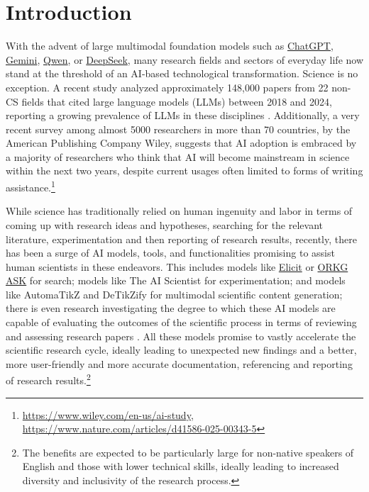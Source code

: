 \section{Introduction}\label{sec:introduction}
With the advent of large multimodal foundation models such as \href{https://chatgpt.com/}{ChatGPT}, \href{https://deepmind.google/technologies/gemini/}{Gemini}, \href{https://github.com/QwenLM/Qwen}{Qwen}, or \href{https://www.deepseek.com/}{DeepSeek}, many research fields and sectors of everyday life now stand at the threshold of an AI-based technological transformation. Science is no exception. A recent study analyzed approximately 148,000 papers from 22 non-CS fields that cited large language models (LLMs) between 2018 and 2024, reporting a growing prevalence of LLMs in these disciplines \cite{pramanick2024transformingscholarlylandscapesinfluence}.
Additionally, a very recent survey among almost 5000 researchers in more than 70 countries, by the American Publishing Company Wiley, suggests that AI adoption is embraced by a majority of researchers who think that AI will become mainstream in science within the next two years, despite current usages often limited to forms of writing assistance.\footnote{\url{https://www.wiley.com/en-us/ai-study}, \url{https://www.nature.com/articles/d41586-025-00343-5}} 


While science has  traditionally relied on human ingenuity and labor in terms of coming up with research ideas and hypotheses, searching for the relevant literature, experimentation and then reporting of research results, recently, there has been a surge of AI models, tools, and functionalities promising to assist human scientists in these endeavors. This includes models like \href{https://elicit.com}{Elicit} or \href{https://ask.orkg.org/de}{ORKG ASK} for search; models like The AI Scientist \citep{lu2024aiscientist} for experimentation; and models like AutomaTikZ \citep{belouadi2024automatikz} and DeTikZify \citep{belouadi2024detikzify} for multimodal scientific content generation; there is even research investigating the degree to which these AI models are capable of evaluating the outcomes of the scientific process in terms of reviewing and assessing research papers \cite{10.1613/jair.1.12862}. All these models promise to vastly accelerate the scientific research cycle, ideally leading to unexpected new findings and a better, more user-friendly and more accurate documentation, referencing and reporting of research results.\footnote{The benefits are expected to be particularly large for non-native speakers of English and those with lower technical skills, ideally leading to increased diversity and inclusivity of the research process.}

